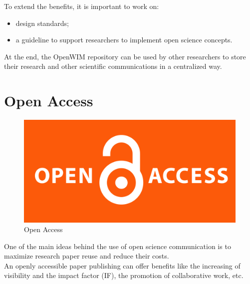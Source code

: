 \documentclass[a0,portrait]{a0poster}
\begin{document}
\begin{multicols}{2}
To extend the benefits, it is important to work on:\\

\begin{itemize}
\item design standards;
\item a guideline to support researchers to implement open science concepts.
\end{itemize}

At the end, the OpenWIM repository can be used by other researchers to store their research and other scientific communications in a centralized way.\\


\color{black} %

\section*{Open Access}

\begin{figure}
  \begin{center}
    \includegraphics[width=500px]{openaccess.png}
  \end{center} 
  \caption{Open Access}
\end{figure}

One of the main ideas behind the use of open science communication is to maximize research paper reuse and reduce their costs.\\

An openly accessible paper publishing can offer benefits like  the increasing of visibility and the impact factor (IF), the promotion of collaborative work, etc.\\


\end{multicols}
\end{document}
